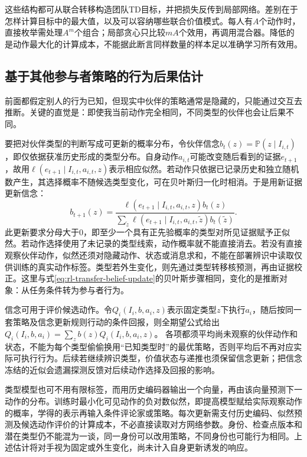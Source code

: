 这些结构都可从联合转移构造团队TD目标，并把损失反传到局部网络。差别在于怎样计算目标中的最大值，以及可以容纳哪些联合价值模式。每人有$A$个动作时，直接枚举需处理$A^m$个组合；局部贪心只比较$mA$个效用，再调用混合器。降低的是动作最大化的计算成本，不能据此断言同样数量的样本足以准确学习所有效用。

\subsection{基于其他参与者策略的行为后果估计}
\label{sec:rl-multi-agent-opponent-model}

前面都假定别人的行为已知，但现实中伙伴的策略通常是隐藏的，只能通过交互去推断。关键的直觉是：即使我当前动作完全相同，不同类型的伙伴也会让后果不同。

要把对伙伴类型的判断写成可更新的概率分布，令伙伴信念$b_t(z)=\mathbb P(z\mid I_{i,t})$，即仅依据获准历史形成的类型分布。自身动作$a_{i,t}$可能改变随后看到的证据$e_{t+1}$，故用$\ell(e_{t+1}\mid I_{i,t},a_{i,t},z)$表示相应似然。若动作只依据已记录历史和独立随机数产生，其选择概率不随候选类型变化，可在贝叶斯归一化时相消。于是用新证据更新信念：
\[
 b_{t+1}(z)=
 \frac{\ell(e_{t+1}\mid I_{i,t},a_{i,t},z)b_t(z)}
      {\sum_{\tilde z}\ell(e_{t+1}\mid I_{i,t},a_{i,t},\tilde z)b_t(\tilde z)}.
\]
此更新要求分母大于0，即至少一个具有正先验概率的类型对所见证据赋予正似然。若动作选择使用了未记录的类型线索，动作概率就不能直接消去。若没有直接观察伙伴动作，似然还须对隐藏动作、状态或消息求和，不能在部署辨识中读取仅供训练的真实动作标签。类型若外生变化，则先通过类型转移核预测，再由证据校正。这里与式\eqref{eq:rl-transfer-belief-update}的贝叶斯步骤相同，变化的是推断对象：从任务条件转为参与者行为。

信念可用于评价候选动作。令$Q_i(I_i,b,a_i,z)$表示固定类型$z$下执行$a_i$，随后按同一套策略及信念更新规则行动的条件回报，则全期望公式给出
$Q_i(I_i,b,a_i)=\sum_z b(z)Q_i(I_i,b,a_i,z)$。
各项都须平均尚未观察的伙伴动作和状态，不能为每个类型偷偷换用“已知类型时”的最优策略，否则平均后不再对应实际可执行行为。后续若继续辨识类型，价值状态与递推也须保留信念更新；把信念冻结的近似会遗漏探测反馈对后续动作选择及回报的影响。

类型模型也可不用有限标签，而用历史编码器输出一个向量，再由该向量预测下一动作的分布。训练时最小化可见动作的负对数似然，即提高模型赋给实际观察动作的概率，学得的表示再输入条件评论家或策略。每次更新需支付历史编码、似然预测及候选动作评价的计算成本，不必直接读取对方网络参数。身份、检查点版本和潜在类型仍不能混为一谈，同一身份可以改用策略，不同身份也可能行为相同。上述估计将对手视为固定或外生变化，尚未计入自身更新诱发的响应。

